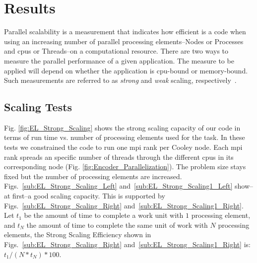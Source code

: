\documentclass[10pt,journal,compsoc]{IEEEtran}
\begin{document}
\section{Results}

Parallel scalability is a measurement that indicates how efficient is a code when using an increasing number of parallel processing elements--Nodes or Processes and \glspl{cpu} or Threads--on a computational resource. There are two ways to measure the parallel performance of a given application. The measure to be applied will depend on whether the application is \gls{cpu}-bound or memory-bound. Such measurements are referred to as \emph{strong} and \emph{weak} scaling, respectively~\cite{noauthor_measuring_nodate}.
















\subsection{ Scaling Tests}

Fig. \ref{fig:EL_Strong_Scaling} shows the strong scaling capacity of our code in terms of run time vs. number of processing elements used for the task. In these tests we constrained the code to run one \gls{mpi} rank per Cooley node. Each \gls{mpi} rank spreads an specific number of threads through the different \glspl{cpu} in its corresponding node (Fig. \ref{fig:Encoder_Parallelization}). The problem size stays fixed but the number of processing elements are increased. Figs.~\ref{sub:EL_Strong_Scaling_Left} and~\ref{sub:EL_Strong_Scaling1_Left} show--at first--a good scaling capacity. This is supported by Figs.~\ref{sub:EL_Strong_Scaling_Right} and~\ref{sub:EL_Strong_Scaling1_Right}. Let $t_1$ be the amount of time to complete a work unit with $1$ processing element, and $t_N$ the amount of time to complete the same unit of work with $N$ processing elements, the Strong Scaling Efficiency shown in Figs.~\ref{sub:EL_Strong_Scaling_Right} and~\ref{sub:EL_Strong_Scaling1_Right} is: $t_1 / (N * t_N) * 100$.
\end{document}

